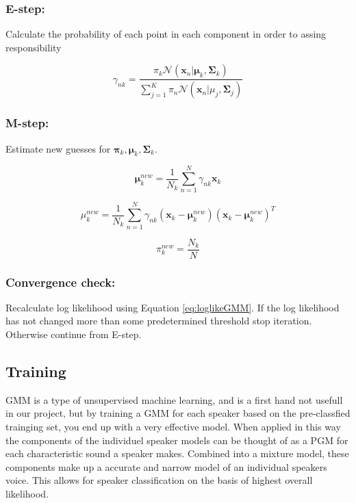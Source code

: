 \subsubsection*{E-step:}
Calculate the probability of each point in each component in order to assing responsibility

\begin{equation}
\gamma_{nk} = 
\frac
{\pi_{k}\mathcal{N}(\mathbf{x}_{n}|\mathbf{\mu}_{k},\mathbf{\Sigma}_{k})}
{\sum_{j=1}^{K} \pi_{n}\mathcal{N}(\mathbf{x}_{n}|\mu_{j},\mathbf{\Sigma}_{j})}
\end{equation}

\subsubsection*{M-step:}
Estimate new guesses for $ \mathbf{\pi}_{k}, \mathbf{\mu}_{k}, \mathbf{\Sigma}_{k} $.

\begin{equation}
\mathbf{\mu}_{k}^{new} = 
\frac{1}{N_{k}}
\sum_{n=1}^{N} 
\gamma_{nk}
\mathbf{x}_{k}
\end{equation}

\begin{equation}
\mu_{k}^{new} = 
\frac{1}{N_{k}}
\sum_{n=1}^{N} 
\gamma_{nk}
(\mathbf{x}_{k} - \mathbf{\mu}_{k}^{new})
(\mathbf{x}_{k} - \mathbf{\mu}_{k}^{new})^{T}
\end{equation}

\begin{equation}
\pi_{k}^{new} =
\frac
{N_{k}}
{N}
\end{equation}

\subsubsection*{Convergence check:}

Recalculate log likelihood using Equation \ref{eq:loglikeGMM}.
If the log likelihood has not changed more than some predetermined threshold stop iteration.
Otherwise continue from E-step.

\subsection*{Training}
GMM is a type of unsupervised machine learning, and is a first hand not usefull in our project, but by training a GMM for each speaker based on the pre-classfied trainging set, you end up with a very effective model.
When applied in this way the components of the individuel speaker models can be thought of as a PGM for each characteristic sound a speaker makes.
Combined into a mixture model, these components make up a accurate and narrow model of an individual speakers voice.
This allows for speaker classification on the basis of highest overall likelihood.

